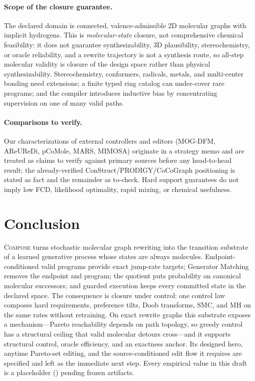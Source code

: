 \documentclass{article}
\newcommand{\method}{\textsc{Compose}\xspace}
\theoremstyle{definition}
\theoremstyle{remark}
\begin{document}
\paragraph{Scope of the closure guarantee.}
The declared domain is connected, valence-admissible 2D molecular graphs with implicit hydrogens. This is \emph{molecular-state} closure, not comprehensive chemical feasibility: it does not guarantee synthesizability, 3D plausibility, stereochemistry, or oracle reliability, and a rewrite trajectory is not a synthesis route, so all-step molecular validity is closure of the design space rather than physical synthesizability. Stereochemistry, conformers, radicals, metals, and multi-center bonding need extensions; a finite typed ring catalog can under-cover rare programs; and the compiler introduces inductive bias by concentrating supervision on one of many valid paths.

\paragraph{Comparisons to verify.}
Our characterizations of external controllers and editors (MOG-DFM, AReUReDi, pCoMole, MARS, MIMOSA) originate in a strategy memo and are treated as claims to verify against primary sources before any head-to-head result; the already-verified ConStruct/PRODIGY/CoCoGraph positioning is stated as fact and the remainder as to-check. Hard support guarantees do not imply low FCD, likelihood optimality, rapid mixing, or chemical usefulness.

\section{Conclusion}

\method turns stochastic molecular graph rewriting into the transition substrate of a learned generative process whose states are always molecules. Endpoint-conditioned valid programs provide exact jump-rate targets; Generator Matching removes the endpoint and program; the quotient puts probability on canonical molecular successors; and guarded execution keeps every committed state in the declared space. The consequence is closure under control: one control law composes hard requirements, preference tilts, Doob transforms, SMC, and MH on the same rates without retraining. On exact rewrite graphs this substrate exposes a mechanism---Pareto reachability depends on path topology, so greedy control has a structural ceiling that valid molecular detours cross---and it supports structural control, oracle efficiency, and an exactness anchor. Its designed hero, anytime Pareto-set editing, and the source-conditioned edit flow it requires are specified and left as the immediate next step. Every empirical value in this draft is a placeholder (\XXX) pending frozen artifacts.
\end{document}
